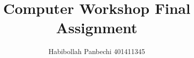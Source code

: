 \documentclass[12pt]{article}
\title{Computer Workshop Final Assignment}
\author{Habibollah Panbechi 401411345}
\begin{document}
\begin{titlepage}
    \maketitle
\end{titlepage}
\tableofcontents
\end{document}
